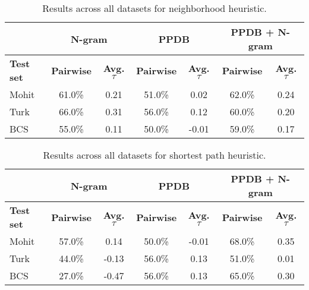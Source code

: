 \begin{table}
\small
\centering
\begin{tabular}{|l|cc|cc|cc|}
	\hline 
	& \multicolumn{2}{c|}{N-gram} 
	& \multicolumn{2}{c|}{PPDB} 
	& \multicolumn{2}{c|}{PPDB + N-gram} \\
	\hline 
	\bf Test set
	& \bf Pairwise & \bf Avg. $\tau$  
	& \bf Pairwise & \bf Avg. $\tau$  
	& \bf Pairwise & \bf Avg. $\tau$  \\ 
	\hline
	Mohit & 61.0\% & 0.21 & 51.0\% & 0.02  & 62.0\% & 0.24 \\
	Turk  & 66.0\% & 0.31 & 56.0\% & 0.12  & 60.0\% & 0.20 \\
	BCS   & 55.0\% & 0.11 & 50.0\% & -0.01 & 59.0\% & 0.17 \\
	\hline
\end{tabular}
\caption{\label{font-table} Results across all datasets for neighborhood heuristic. }
\end{table}


\begin{table}
\small
\centering
\begin{tabular}{|l|cc|cc|cc|}
	\hline 
	& \multicolumn{2}{c|}{N-gram} 
	& \multicolumn{2}{c|}{PPDB} 
	& \multicolumn{2}{c|}{PPDB + N-gram} \\
	\hline 
	\bf Test set
	& \bf Pairwise & \bf Avg. $\tau$  
	& \bf Pairwise & \bf Avg. $\tau$  
	& \bf Pairwise & \bf Avg. $\tau$  \\ 
	\hline
	Mohit & 57.0\% & 0.14  & 50.0\% & -0.01 & 68.0\% & 0.35 \\
	Turk  & 44.0\% & -0.13 & 56.0\% & 0.13  & 51.0\% & 0.01 \\
	BCS   & 27.0\% & -0.47 & 56.0\% & 0.13  & 65.0\% & 0.30 \\
	\hline
\end{tabular}
\caption{\label{font-table} Results across all datasets for shortest path heuristic.}
\end{table}



